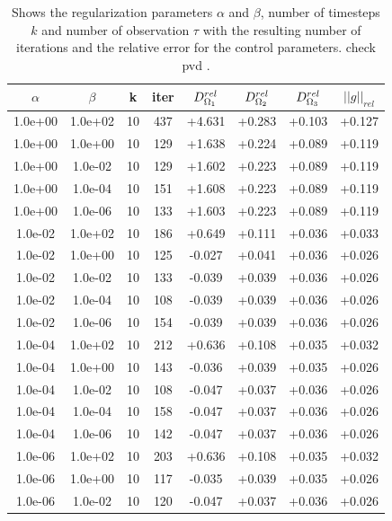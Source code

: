 \documentclass[11pt,a4paper]{article}
\begin{document}
\begin{table}
\centering
\caption{Shows the regularization parameters $\alpha$ and $\beta$, number of timesteps $k$ and number of observation $\tau$ with the resulting number of iterations and the relative error for the control parameters. {\color{red} check pvd }.}
\begin{tabular}{*{8}c}
$\alpha$ & $\beta$ & k  & iter & $ D_{\Omega_1}\sp{rel}$ & $ D_{\Omega_2}\sp{rel} $ & $D_{\Omega_3}\sp{rel}$ & $||g||_{rel}$ \\
\hline 
 1.0e+00 	 & 1.0e+02 	 & 10 & 437 	 & +4.631 & +0.283 & +0.103 & +0.127 \\ 
 1.0e+00 	 & 1.0e+00 	 & 10 & 129 	 & +1.638 & +0.224 & +0.089 & +0.119 \\ 
 1.0e+00 	 & 1.0e-02 	 & 10 & 129 	 & +1.602 & +0.223 & +0.089 & +0.119 \\ 
 1.0e+00 	 & 1.0e-04 	 & 10 & 151 	 & +1.608 & +0.223 & +0.089 & +0.119 \\ 
 1.0e+00 	 & 1.0e-06 	 & 10 & 133 	 & +1.603 & +0.223 & +0.089 & +0.119 \\ 
 1.0e-02 	 & 1.0e+02 	 & 10 & 186 	 & +0.649 & +0.111 & +0.036 & +0.033 \\ 
 1.0e-02 	 & 1.0e+00 	 & 10 & 125 	 & -0.027 & +0.041 & +0.036 & +0.026 \\ 
 1.0e-02 	 & 1.0e-02 	 & 10 & 133 	 & -0.039 & +0.039 & +0.036 & +0.026 \\ 
 1.0e-02 	 & 1.0e-04 	 & 10 & 108 	 & -0.039 & +0.039 & +0.036 & +0.026 \\ 
 1.0e-02 	 & 1.0e-06 	 & 10 & 154 	 & -0.039 & +0.039 & +0.036 & +0.026 \\ 
 1.0e-04 	 & 1.0e+02 	 & 10 & 212 	 & +0.636 & +0.108 & +0.035 & +0.032 \\ 
 1.0e-04 	 & 1.0e+00 	 & 10 & 143 	 & -0.036 & +0.039 & +0.035 & +0.026 \\ 
 1.0e-04 	 & 1.0e-02 	 & 10 & 108 	 & -0.047 & +0.037 & +0.036 & +0.026 \\ 
 1.0e-04 	 & 1.0e-04 	 & 10 & 158 	 & -0.047 & +0.037 & +0.036 & +0.026 \\ 
 1.0e-04 	 & 1.0e-06 	 & 10 & 142 	 & -0.047 & +0.037 & +0.036 & +0.026 \\ 
 1.0e-06 	 & 1.0e+02 	 & 10 & 203 	 & +0.636 & +0.108 & +0.035 & +0.032 \\ 
 1.0e-06 	 & 1.0e+00 	 & 10 & 117 	 & -0.035 & +0.039 & +0.035 & +0.026 \\ 
 1.0e-06 	 & 1.0e-02 	 & 10 & 120 	 & -0.047 & +0.037 & +0.036 & +0.026 \\ 

\end{tabular}
\end{table}
\end{document}
